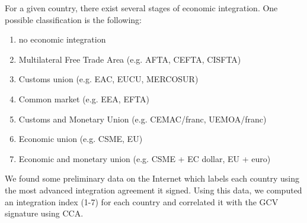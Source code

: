 For a given country, there exist several stages of economic integration. One possible classification is the following:
\begin{enumerate}
 \item no economic integration 
 \item Multilateral Free Trade Area (e.g. AFTA, CEFTA, CISFTA)
 \item Customs union (e.g. EAC, EUCU, MERCOSUR)
 \item Common market (e.g. EEA, EFTA) 
 \item Customs and Monetary Union (e.g. CEMAC/franc, UEMOA/franc) 
 \item Economic union (e.g. CSME, EU) 
 \item Economic and monetary union (e.g. CSME + EC dollar, EU + euro)
\end{enumerate}

We found some preliminary data on the Internet which labels each country using the most advanced integration agreement it signed. Using this data, we computed an integration index (1-7) for each country and correlated it with the GCV signature using CCA.


